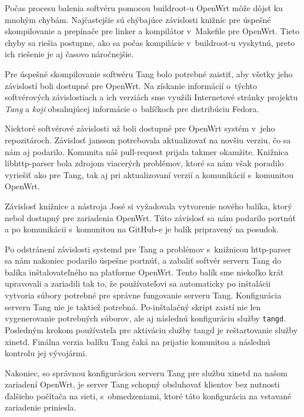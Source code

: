 Počas procesu balenia softvéru pomocou buildroot-u OpenWrt môže dôjsť ku mnohým chybám.
Najčastejšie sú chýbajúce závislosti knižníc pre úspešné skompilovanie a prepínače pre linker a kompilátor v~Makefile pre OpenWrt.
Tieto chyby sa riešia postupne, ako sa počas kompilácie v~buildroot-u vyskytnú, preto ich riešenie je aj časovo náročnejšie.

Pre úspešné skompilovanie softwéru Tang bolo potrebné zaistiť, aby všetky jeho závislostí boli dostupné pre OpenWrt.
Na získanie informácií o~týchto softvérových závislostiach a ich verziách sme využili Internetové stránky projektu {\it Tang} a {\it koji} obsahujúcej informácie o~balíčkoch pre distribúciu Fedora.

Niektoré softvérové závislosti už boli dostupné pre OpenWrt systém v~jeho repozitároch.
Závislosť jansson potrebovala aktualizovať na novšiu verziu, čo sa nám aj podarilo.
Komunita náš pull-request prijala takmer okamžite.
Knižnica libhttp-parser bola zdrojom viacerých problémov, ktoré sa nám však poradilo vyriešiť ako pre Tang, tak aj pri aktualizovaní verzií a komunikácií s~komunitou OpenWrt.

Závislosť knižnice a nástroja José si vyžadovala vytvorenie nového balíka, ktorý nebol dostupný pre zariadenia OpenWrt.
Túto závislosť sa nám podarilo portnúť a po komunikácii s~komunitou na GitHub-e je balík pripravený na posudok.

Po odstránení závislosti systemd pre Tang a problémov s~knižnicou http-parser sa nám nakoniec podarilo úspešne portnúť, a zabaliť softvér serveru Tang do balíka inštalovateľného na platforme OpenWrt.
Tento balík sme niekoľko krát upravovali a zariadili tak to, že používateľovi sa automaticky po inštalácii vytvoria súbory potrebné pre správne fungovanie serveru Tang.
Konfigurácia serveru Tang nie je taktiež potrebná.
Po-inštalačný skript zaistí nie len vygenerovanie potrebných súborov, ale aj následnú konfiguráciu služby {\tt tangd}.
Posledným krokom používateľa pre aktiváciu služby tangd je reštartovanie služby xinetd.
Finálna verzia balíku Tang čaká na prijatie komunitou a následnú kontrolu jej vývojármi.

Nakoniec, so správnou konfiguráciou serveru Tang pre službu xinetd na našom zariadení OpenWrt, je server Tang schopný obsluhovať klientov bez nutnosti ďalšieho počítača na sieti, s~obmedzeniami, ktoré táto konfigurácia na vstavané zariadenie priniesla.
